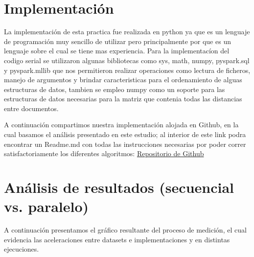 \documentclass[fleqn,10pt]{SelfArx} %
\begin{document}




\section{Implementación}
La implementación de esta practica fue realizada en python ya que es un lenguaje de programación muy sencillo de utilizar pero principalmente por que es un lenguaje sobre el cual se tiene mas experiencia.
Para la implementacíon del codigo serial se utilizaron algunas bibliotecas como sys, math, numpy, pyspark.sql y  pyspark.mllib que nos permitieron realizar operaciones como lectura de ficheros, manejo de argumentos y brindar caracteristicas para el ordenamiento de alguas estructuras de datos, tambien se empleo numpy como un soporte para las estructuras de datos necesarias para la matriz que contenia todas las distancias entre documentos.


A continuación compartimos nuestra implementación alojada en Github, en la cual basamos el análisis presentado en este estudio; al interior de este link podra encontrar un Readme.md con todas las instrucciones necesarias por poder correr satisfactoriamente los diferentes algoritmos: \href{https://github.com/jonyzp/HPC}{Repositorio de Github}

\section{Análisis de resultados (secuencial vs. paralelo)}

A continuación presentamos el gráfico resultante del proceso de medición, el cual evidencia las aceleraciones entre datasets e implementaciones y en distintas ejecuciones.
\end{document}
